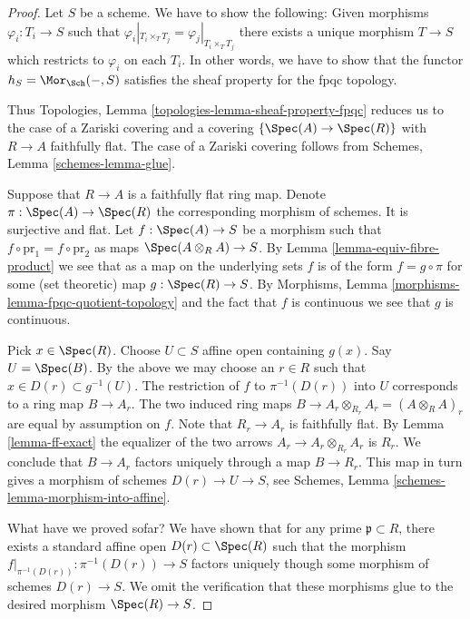 \begin{proof}
Let $S$ be a scheme. We have to show the following:
Given morphisms $\varphi_i : T_i \to S$
such that $\varphi_i|_{T_i \times_T T_j} = \varphi_j|_{T_i \times_T T_j}$
there exists a unique morphism $T \to S$ which restricts
to $\varphi_i$ on each $T_i$.
In other words, we have to show that the functor
$h_S = \Mor_{\Sch}( - , S)$ satisfies
the sheaf property for the fpqc topology.

\medskip\noindent
Thus Topologies, Lemma \ref{topologies-lemma-sheaf-property-fpqc}
reduces us to the case of a Zariski covering and a covering
$\{\Spec(A) \to \Spec(R)\}$ with $R \to A$ faithfully flat.
The case of a Zariski covering follows from
Schemes, Lemma \ref{schemes-lemma-glue}.

\medskip\noindent
Suppose that $R \to A$ is a faithfully flat ring map.
Denote $\pi : \Spec(A) \to \Spec(R)$ the
corresponding morphism of schemes. It is surjective and flat.
Let $f : \Spec(A) \to S$ be a morphism
such that $f \circ \text{pr}_1 = f \circ \text{pr}_2$
as maps $\Spec(A \otimes_R A) \to S$.
By Lemma \ref{lemma-equiv-fibre-product} we see that
as a map on the underlying
sets $f$ is of the form $f = g \circ \pi$ for some
(set theoretic) map $g : \Spec(R) \to S$.
By Morphisms, Lemma \ref{morphisms-lemma-fpqc-quotient-topology}
and the fact that $f$ is continuous we see that $g$
is continuous.

\medskip\noindent
Pick $x \in \Spec(R)$.
Choose $U \subset S$ affine open containing $g(x)$.
Say $U = \Spec(B)$.
By the above we may choose an $r \in R$ such that
$x \in D(r) \subset g^{-1}(U)$.
The restriction of $f$ to $\pi^{-1}(D(r))$ into $U$
corresponds to a ring map $B \to A_r$. The two induced
ring maps $B \to A_r \otimes_{R_r} A_r = (A \otimes_R A)_r$ are equal
by assumption on $f$.
Note that $R_r \to A_r$ is faithfully flat.
By Lemma \ref{lemma-ff-exact} the equalizer of
the two arrows $A_r \to A_r \otimes_{R_r} A_r$ is $R_r$.
We conclude that $B \to A_r$ factors uniquely through a map $B \to R_r$.
This map in turn gives a morphism of schemes $D(r) \to U \to S$,
see Schemes, Lemma \ref{schemes-lemma-morphism-into-affine}.

\medskip\noindent
What have we proved sofar? We have shown that for any prime
$\mathfrak p \subset R$, there exists a standard affine open
$D(r) \subset \Spec(R)$ such that the morphism
$f|_{\pi^{-1}(D(r))} : \pi^{-1}(D(r)) \to S$ factors uniquely
though some morphism of schemes $D(r) \to S$. We omit the
verification that these morphisms glue to the desired
morphism $\Spec(R) \to S$.
\end{proof}




